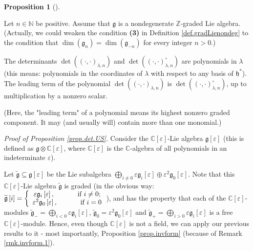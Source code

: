 \documentclass
[numbers=enddot,12pt,final,onecolumn,german,notitlepage]{scrartcl}%
\theoremstyle{definition}
\newtheorem{prop}[theo]{Proposition}
\newenvironment{proposition}[1][]
{\begin{prop}[#1]\begin{leftbar}}
{\end{leftbar}\end{prop}}
\begin{document}
\begin{proposition}
\label{prop.det.US}Let $n\in\mathbb{N}$ be positive. Assume that
$\mathfrak{g}$ is a nondegenerate $\mathbb{Z}$-graded Lie algebra. (Actually,
we could weaken the condition \textbf{(3)} in Definition
\ref{def.gradLienondeg} to the condition that $\dim\left(  \mathfrak{g}%
_{n}\right)  =\dim\left(  \mathfrak{g}_{-n}\right)  $ for every integer $n>0$.)

The determinants $\det\left(  \left(  \cdot,\cdot\right)  _{\lambda,n}\right)
$ and $\det\left(  \left(  \cdot,\cdot\right)  _{\lambda,n}^{\circ}\right)  $
are polynomials in $\lambda$ (this means: polynomials in the coordinates of
$\lambda$ with respect to any basis of $\mathfrak{h}^{\ast}$). The leading
term of the polynomial $\det\left(  \left(  \cdot,\cdot\right)  _{\lambda
,n}\right)  $ is $\det\left(  \left(  \cdot,\cdot\right)  _{\lambda,n}^{\circ
}\right)  $, up to multiplication by a nonzero scalar.

(Here, the "leading term" of a polynomial means its highest nonzero graded
component. It may (and usually will) contain more than one monomial.)
\end{proposition}

\textit{Proof of Proposition \ref{prop.det.US}.} Consider the $\mathbb{C}%
\left[  \varepsilon\right]  $-Lie algebra $\mathfrak{g}\left[  \varepsilon
\right]  $ (this is defined as $\mathfrak{g}\otimes\mathbb{C}\left[
\varepsilon\right]  $, where $\mathbb{C}\left[  \varepsilon\right]  $ is the
$\mathbb{C}$-algebra of all polynomials in an indeterminate $\varepsilon$).

Let $\widetilde{\mathfrak{g}}\subseteq\mathfrak{g}\left[  \varepsilon\right]
$ be the Lie subalgebra $\bigoplus\limits_{i\neq0}\varepsilon\mathfrak{g}%
_{i}\left[  \varepsilon\right]  \oplus\varepsilon^{2}\mathfrak{g}_{0}\left[
\varepsilon\right]  $. Note that this $\mathbb{C}\left[  \varepsilon\right]
$-Lie algebra $\widetilde{\mathfrak{g}}$ is graded (in the obvious way:
$\widetilde{\mathfrak{g}}\left[  i\right]  =\left\{
\begin{array}
[c]{c}%
\varepsilon\mathfrak{g}_{i}\left[  \varepsilon\right]
,\ \ \ \ \ \ \ \ \ \ \text{if }i\neq0;\\
\varepsilon^{2}\mathfrak{g}_{0}\left[  \varepsilon\right]
,\ \ \ \ \ \ \ \ \ \ \text{if }i=0
\end{array}
\right.  $), and has the property that each of the $\mathbb{C}\left[
\varepsilon\right]  $-modules $\widetilde{\mathfrak{g}}_{-}=\bigoplus
\limits_{i<0}\varepsilon\mathfrak{g}_{i}\left[  \varepsilon\right]  $,
$\widetilde{\mathfrak{g}}_{0}=\varepsilon^{2}\mathfrak{g}_{0}\left[
\varepsilon\right]  $ and $\widetilde{\mathfrak{g}}_{+}=\bigoplus
\limits_{i>0}\varepsilon\mathfrak{g}_{i}\left[  \varepsilon\right]  $ is a
free $\mathbb{C}\left[  \varepsilon\right]  $-module. Hence, even though
$\mathbb{C}\left[  \varepsilon\right]  $ is not a field, we can apply our
previous results to it - most importantly, Proposition \ref{prop.invform}
(because of Remark \ref{rmk.invform.1}).
\end{document}
